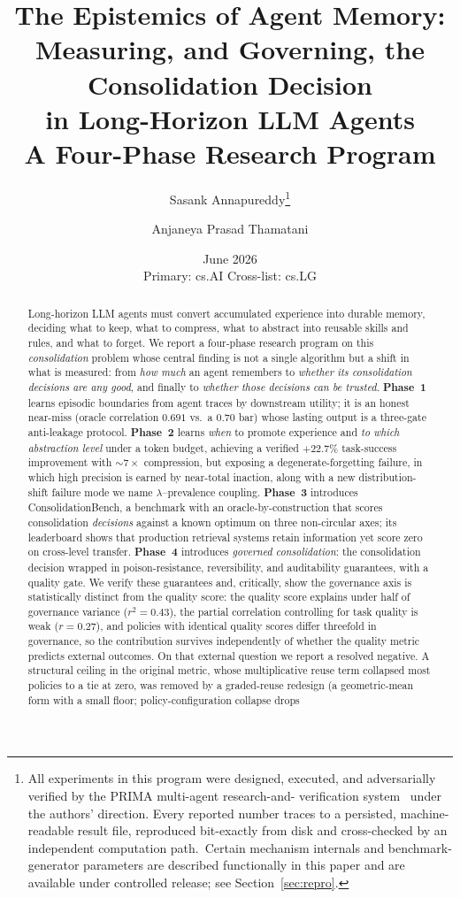 \documentclass[11pt]{article}
\title{\textbf{The Epistemics of Agent Memory:\\
Measuring, and Governing, the Consolidation Decision\\
in Long-Horizon LLM Agents}\\[0.5em]
\large A Four-Phase Research Program}
\author{Sasank Annapureddy\thanks{All experiments in this program were designed,
executed, and adversarially verified by the PRIMA multi-agent research-and-%
verification system~\cite{prima} under the authors' direction. Every reported number
traces to a persisted, machine-readable result file, reproduced bit-exactly from
disk and cross-checked by an independent computation path. \controlled\,Certain
mechanism internals and benchmark-generator parameters are described functionally
in this paper and are available under controlled release; see
Section~\ref{sec:repro}.}
\and Anjaneya Prasad Thamatani}
\date{June 2026 \\[0.3em] \small Primary: cs.AI \quad Cross-list: cs.LG}
\newcommand{\bench}{ConsolidationBench}
\begin{document}
\maketitle

\begin{abstract}
Long-horizon LLM agents must convert accumulated experience into durable memory, deciding what to keep, what to compress, what to abstract into reusable skills and
rules, and what to forget. We report a four-phase research program on this
\emph{consolidation} problem whose central finding is not a single algorithm but a
shift in what is measured: from \emph{how much} an agent remembers to \emph{whether
its consolidation decisions are any good}, and finally to \emph{whether those
decisions can be trusted}.
\textbf{Phase~1} learns episodic boundaries from agent traces by downstream utility;
it is an honest near-miss (oracle correlation $0.691$ vs.\ a $0.70$ bar) whose
lasting output is a three-gate anti-leakage protocol.
\textbf{Phase~2} learns \emph{when} to promote experience and \emph{to which
abstraction level} under a token budget, achieving a verified $+22.7\%$ task-success
improvement with ${\sim}7\times$ compression, but exposing a degenerate-forgetting
failure, in which high precision is earned by near-total inaction, along with a new
distribution-shift failure mode we name $\lambda$--prevalence coupling.
\textbf{Phase~3} introduces \bench{}, a benchmark with an oracle-by-construction that
scores consolidation \emph{decisions} against a known optimum on three non-circular
axes; its leaderboard shows that production retrieval systems retain information yet
score zero on cross-level transfer.
\textbf{Phase~4} introduces \emph{governed consolidation}: the consolidation decision
wrapped in poison-resistance, reversibility, and auditability guarantees, with a
quality gate. We verify these guarantees and, critically, show the governance axis
is statistically distinct from the quality score: the quality score explains under
half of governance variance ($r^2 = 0.43$), the partial correlation controlling for
task quality is weak ($r = 0.27$), and policies with identical quality scores differ
threefold in governance, so the contribution survives independently of whether the
quality metric predicts external outcomes. On that external question we report a
resolved negative. A structural ceiling in the original metric, whose multiplicative
reuse term collapsed most policies to a tie at zero, was removed by a graded-reuse
redesign (a geometric-mean form with a small floor; policy-configuration collapse drops

\end{abstract}
\end{document}
